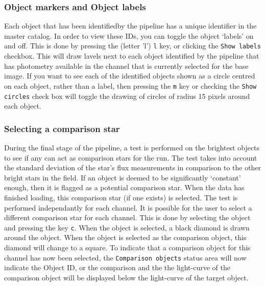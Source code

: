 \subsubsection{Object markers and Object labels}
Each object that has been identifiedby the pipeline has a unique identifier in the master catalog. In order to view these IDs, you can toggle the object `labels' on and off. This is done by pressing the (letter 'l') \texttt{l} key, or clicking the \texttt{Show labels} checkbox. This will draw lavels next to each object identified by the pipeline that has photometry available in the channel that is currently selected for the base image. If you want to see each of the identified objects shown as a circle centred on each object, rather than a label, then pressing the \texttt{m} key or checking the \texttt{Show circles} check box will toggle the drawing of circles of radius 15 pixels around each object.   

\subsubsection{Selecting a comparison star}
During the final stage of the pipeline, a test is performed on the brightest objects to see if any can act as comparison stars for the run. The test takes into account the standard deviation of the star's flux measurements in comparison to the other bright stars in the field. If an object is deemed to be significantly `constant' enough, then it is flagged as a potential comparison star. When the data has finished loading, this comparison star (if one exists) is selected. The test is performed independantly for each channel. It is possible for the user to select a different comparison star for each channel. This is done by selecting the object and pressing the key \texttt{c}. When the object is selected, a black diamond is drawn around the object. When the object is selected as the comparison object, this diamond will change to a square. To indicate that a comparison object for this channel has now been selected, the \texttt{Comparison objects} status area will now indicate the Object ID, or the comparison and the the light-curve of the comparison object will be displayed below the light-curve of the target object.

